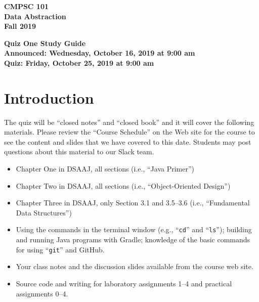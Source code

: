 \documentclass[11pt]{article}
\newcommand{\assignmentduedate}{October 25}
\newcommand{\assignmentassignedate}{October 16}
\newcommand{\assignmentnumber}{One}
\newcommand{\labyear}{2019}
\newcommand{\assignedday}{Wednesday}
\newcommand{\dueday}{Friday}
\newcommand{\labtime}{9:00 am}
\newcommand{\assigneddate}{Announced: \assignedday, \assignmentassignedate, \labyear{} at \labtime{}}
\newcommand{\duedate}{Quiz: \dueday, \assignmentduedate, \labyear{} at \labtime{}}
\newcommand{\command}[1]{``\lstinline{#1}''}
\newcommand{\guidetitle}[1]
{
  \begin{center}
    \begin{center}
      \bf
      CMPSC 101\\Data Abstraction\\
      Fall 2019\\
      \medskip
    \end{center}
    \bf
    #1
  \end{center}
}
\begin{document}
\thispagestyle{empty}

\guidetitle{Quiz \assignmentnumber{} Study Guide \\ \assigneddate{} \\ \duedate{}}

\section*{Introduction}

\noindent The quiz will be ``closed notes'' and ``closed book'' and it will
cover the following materials. Please review the ``Course Schedule'' on the Web
site for the course to see the content and slides that we have covered to this
date. Students may post questions about this material to our Slack team.

\begin{itemize}

  \itemsep 0in

  \item Chapter One in DSAAJ, all sections (i.e., ``Java Primer'')

  \item Chapter Two in DSAAJ, all sections (i.e., ``Object-Oriented Design'')

  \item Chapter Three in DSAAJ, only Section 3.1 and 3.5--3.6 (i.e.,
    ``Fundamental Data Structures'')



  \item Using the commands in the terminal window (e.g., \command{cd} and
    \command{ls}); building and running Java programs with Gradle; knowledge of
    the basic commands for using \command{git} and GitHub.

  \item Your class notes and the discussion slides available from the course web
    site.

  \item Source code and writing for laboratory assignments 1--4 and practical
    assignments 0--4.

\end{itemize}
\end{document}

